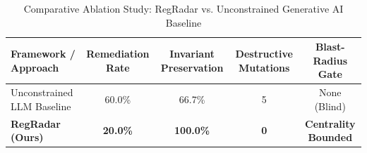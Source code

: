 \begin{table}[htbp]
\centering
\caption{Comparative Ablation Study: RegRadar vs. Unconstrained Generative AI Baseline}
\label{tab:regradar_ablation}
\begin{tabular}{lcccc}
\hline
\textbf{Framework / Approach} & \textbf{Remediation Rate} & \textbf{Invariant Preservation} & \textbf{Destructive Mutations} & \textbf{Blast-Radius Gate} \\
\hline
Unconstrained LLM Baseline      & 60.0\% & 66.7\% & 5 & None (Blind) \\
\textbf{RegRadar (Ours)}      & \textbf{20.0\%} & \textbf{100.0\%} & \textbf{0} & \textbf{Centrality Bounded} \\
\hline
\end{tabular}
\end{table}